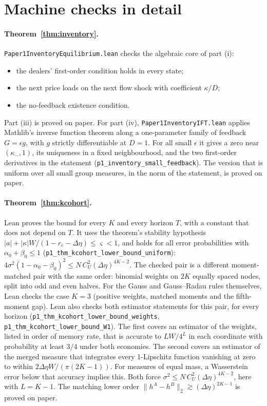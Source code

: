 \documentclass[12pt]{article}
\theoremstyle{definition}
\theoremstyle{remark}
\begin{document}
\section{Machine checks in detail}\label{app:mc}

\paragraph{Theorem~\ref{thm:inventory}.}
\nolinkurl{Paper1InventoryEquilibrium.lean} checks the algebraic core of part (i):
\begin{itemize}[itemsep=1pt,topsep=2pt]
\item the dealers' first-order condition holds in every state;
\item the next price loads on the next flow shock with coefficient $\kappa/D$;
\item the no-feedback existence condition.
\end{itemize}
Part (iii) is proved on paper. For part (iv), \nolinkurl{Paper1InventoryIFT.lean} applies Mathlib's inverse function theorem along a one-parameter family of feedback $G=\epsilon g$, with $g$ strictly differentiable at $D=1$. For all small $\epsilon$ it gives a zero near $(\kappa_-,1)$, its uniqueness in a fixed neighbourhood, and the two first-order derivatives in the statement (\nolinkurl{p1_inventory_small_feedback}). The version that is uniform over all small group measures, in the norm of the statement, is proved on paper.
\paragraph{Theorem~\ref{thm:kcohort}.}
Lean proves the bound for every $K$ and every horizon $T$, with a constant that does not depend on $T$. It uses the theorem's stability hypothesis $|a|+|\kappa|W/(1-r_c-\Delta\eta)\le\varsigma<1$, and holds for all error probabilities with $\alpha_0+\beta_0\le1$ (\nolinkurl{p1_thm_kcohort_lower_bound_uniform}): $4\sigma^2(1-\alpha_0-\beta_0)^2\le N\,C_U^2(\Delta\eta)^{4K-2}$. The checked pair is a different moment-matched pair with the same order: binomial weights on $2K$ equally spaced nodes, split into odd and even halves. For the Gauss and Gauss--Radau rules themselves, Lean checks the case $K=3$ (positive weights, matched moments and the fifth-moment gap). Lean also checks both estimator statements for this pair, for every horizon (\nolinkurl{p1_thm_kcohort_lower_bound_weights}, \nolinkurl{p1_thm_kcohort_lower_bound_W1}). The first covers an estimator of the weights, listed in order of memory rate, that is accurate to $LW/4^L$ in each coordinate with probability at least $3/4$ under both economies. The second covers an estimator of the merged measure that integrates every 1-Lipschitz function vanishing at zero to within $2\Delta\eta W/(\pi(2K-1))$. For measures of equal mass, a Wasserstein error below that accuracy implies this. Both force $\sigma^2\le N\,C_U^2(\Delta\eta)^{4K-2}$, here with $L=K-1$. The matching lower order $\|h^A-h^B\|_2\gtrsim(\Delta\eta)^{2K-1}$ is proved on paper.
\end{document}
